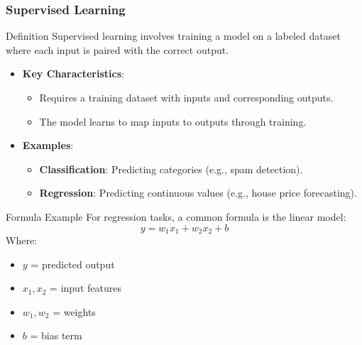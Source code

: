 \documentclass[aspectratio=169]{beamer}
\begin{document}
\begin{frame}[fragile]
    \frametitle{Supervised Learning}
    \begin{block}{Definition}
        Supervised learning involves training a model on a labeled dataset where each input is paired with the correct output.
    \end{block}
    
    \begin{itemize}
        \item \textbf{Key Characteristics}:
        \begin{itemize}
            \item Requires a training dataset with inputs and corresponding outputs.
            \item The model learns to map inputs to outputs through training.
        \end{itemize}
        
        \item \textbf{Examples}:
        \begin{itemize}
            \item \textbf{Classification}: Predicting categories (e.g., spam detection).
            \item \textbf{Regression}: Predicting continuous values (e.g., house price forecasting).
        \end{itemize}
    \end{itemize}
    
    \begin{block}{Formula Example}
        For regression tasks, a common formula is the linear model:
        \begin{equation}
            y = w_1x_1 + w_2x_2 + b
        \end{equation}
        Where:
        \begin{itemize}
            \item \(y\) = predicted output
            \item \(x_1, x_2\) = input features
            \item \(w_1, w_2\) = weights
            \item \(b\) = bias term
        \end{itemize}
    \end{block}
\end{frame}
\end{document}
